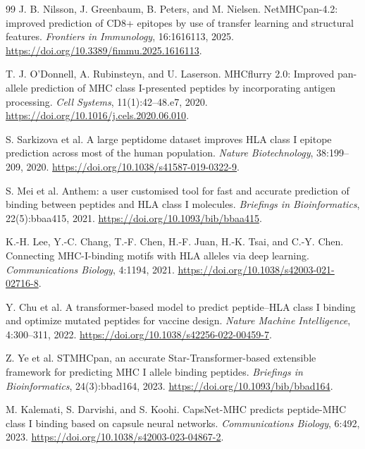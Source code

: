 \begin{thebibliography}{99}
J. B. Nilsson, J. Greenbaum, B. Peters, and M. Nielsen.
\newblock NetMHCpan-4.2: improved prediction of CD8+ epitopes by use of transfer learning and structural features.
\newblock \emph{Frontiers in Immunology}, 16:1616113, 2025.
\newblock \url{https://doi.org/10.3389/fimmu.2025.1616113}.

T. J. O'Donnell, A. Rubinsteyn, and U. Laserson.
\newblock MHCflurry 2.0: Improved pan-allele prediction of MHC class I-presented peptides by incorporating antigen processing.
\newblock \emph{Cell Systems}, 11(1):42--48.e7, 2020.
\newblock \url{https://doi.org/10.1016/j.cels.2020.06.010}.

S. Sarkizova et al.
\newblock A large peptidome dataset improves HLA class I epitope prediction across most of the human population.
\newblock \emph{Nature Biotechnology}, 38:199--209, 2020.
\newblock \url{https://doi.org/10.1038/s41587-019-0322-9}.

S. Mei et al.
\newblock Anthem: a user customised tool for fast and accurate prediction of binding between peptides and HLA class I molecules.
\newblock \emph{Briefings in Bioinformatics}, 22(5):bbaa415, 2021.
\newblock \url{https://doi.org/10.1093/bib/bbaa415}.

K.-H. Lee, Y.-C. Chang, T.-F. Chen, H.-F. Juan, H.-K. Tsai, and C.-Y. Chen.
\newblock Connecting MHC-I-binding motifs with HLA alleles via deep learning.
\newblock \emph{Communications Biology}, 4:1194, 2021.
\newblock \url{https://doi.org/10.1038/s42003-021-02716-8}.

Y. Chu et al.
\newblock A transformer-based model to predict peptide--HLA class I binding and optimize mutated peptides for vaccine design.
\newblock \emph{Nature Machine Intelligence}, 4:300--311, 2022.
\newblock \url{https://doi.org/10.1038/s42256-022-00459-7}.

Z. Ye et al.
\newblock STMHCpan, an accurate Star-Transformer-based extensible framework for predicting MHC I allele binding peptides.
\newblock \emph{Briefings in Bioinformatics}, 24(3):bbad164, 2023.
\newblock \url{https://doi.org/10.1093/bib/bbad164}.

M. Kalemati, S. Darvishi, and S. Koohi.
\newblock CapsNet-MHC predicts peptide-MHC class I binding based on capsule neural networks.
\newblock \emph{Communications Biology}, 6:492, 2023.
\newblock \url{https://doi.org/10.1038/s42003-023-04867-2}.


\end{thebibliography}

